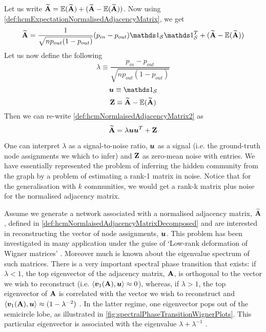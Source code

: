 Let us write $\widetilde{\mathbf A} = \mathbb{E}(\widetilde{\mathbf A}) + (\widetilde{\mathbf A} - \mathbb{E}(\widetilde{\mathbf A}))$. Now using \cref{def:hcmExpectationNormalisedAdjacencyMatrix}, we get
\begin{equation}
	\label{def:hcmNormlaisedAdjacencyMatrix2}
	\widetilde{\matvar{A}} = \frac{1}{\sqrt{np_{out}(1-p_{out})}} (p_{in} - p_{out}) \one_{\setvar{S}}\transpose{\one_{\setvar{S}}} + (\widetilde{\matvar{A}} - \expectation{\widetilde{\matvar{A}}})
\end{equation}
Let us now define the following
\begin{equation}
	\label{def:hcmLambda}
	\lambda \equiv \frac{p_{in} - p_{out}}{\sqrt{np_{out}(1-p_{out})}}
\end{equation}
\begin{equation}
	\label{def:hcmU}
	\vecvar{u} \equiv \one_{\setvar{S}}
\end{equation}
\begin{equation}
	\label{def:hcmZ}
	\mathbf Z \equiv \widetilde{\mathbf A} - \mathbb{E}(\widetilde{\mathbf A})
\end{equation}
Then we can re-write \cref{def:hcmNormlaisedAdjacencyMatrix2} as
\begin{equation}
	\label{def:hcmNormlaisedAdjacencyMatrixDecomposed}
	\widetilde{\matvar{A}} = \lambda \vecvar{u}\transpose{\vecvar{u}} + \matvar{Z}
\end{equation}

One can interpret $\lambda$ as a signal-to-noise ratio, $\vecvar{u}$ as a signal (i.e. the ground-truth node assignments we which to infer) and $\mathbf Z$ as zero-mean noise with \iid entries.
We have essentially represented the problem of inferring the hidden community from the graph by a problem of estimating a rank-1 matrix in noise. Notice that for the generalisation with $k$ communities, we would get a rank-k matrix plus noise for the normalised adjacency matrix.

Assume we generate a network associated with a normalised adjacency matrix, $\widetilde{\mathbf A}$, defined in \cref{def:hcmNormlaisedAdjacencyMatrixDecomposed} and are interested in reconstructing the vector of node assignments, $\vecvar{u}$.
This problem has been investigated in many application under the guise of `Low-rank deformation of Wigner matrices' \cite{Mon13}.
Moreover much is known about the eigenvalue spectrum of such matrices. There is a very important spectral phase transition that exists: if $\lambda < 1$, the top eigenvector of the adjacency matrix, $\mathbf A$, is orthogonal to the vector we wish to reconstruct (i.e. $\innerP{\vecvar{v}_{1}(\matvar{A}),\vecvar{u} } \approx 0$), whereas, if $\lambda > 1$, the top eigenvector of $\mathbf A$ is correlated with the vector we wish to reconstruct and $\innerP{\vecvar{v}_{1}(\matvar{A}),\vecvar{u}} \approx (1 - \lambda^{-2})$ \cite{Mon13}.
In the latter regime, one eigenvector pops out of the semicircle lobe, as illustrated in \cref{fig:spectralPhaseTransitionWignerPlots}.
This particular eigenvector is associated with the eigenvalue $\lambda + \lambda^{-1}$ \cite{Mon13}.

